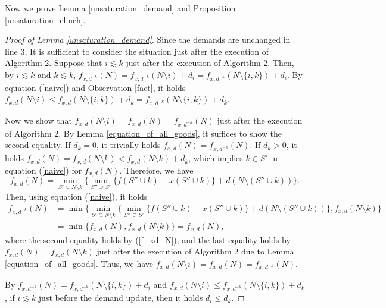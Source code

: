 \documentclass[letterpaper,11pt]{article}
\begin{document}
Now we prove Lemma \ref{unsaturation_demand} and Proposition \ref{unsaturation_clinch}.

\begin{proof}[Proof of Lemma \ref{unsaturation_demand}]
	Since the demands are unchanged in line 3, 
	It is sufficient to consider the situation just after the execution of Algorithm 2. 
	Suppose that $i\lesssim k$ just after the execution of Algorithm 2. 
	Then, by $i\lesssim k$ and $k\lesssim k$, 
	$f_{x,d^{-k}}(N)=f_{x,d^{-k}}(N\setminus i)+d_i=f_{x,d^{-k}}(N\setminus \{i,k\})+d_i$.
	By equation (\ref{naive}) and Observation \ref{fact}, it holds 
	$f_{x,d}(N\setminus i)\leq f_{x,d}(N\setminus \{i,k\})+d_k=f_{x,d^{-k}}(N\setminus \{i,k\})+d_k$.
	
	Now we show that $f_{x,d}(N\setminus i)=f_{x,d}(N)=f_{x,d^{-k}}(N)$ 
	just after the execution of Algorithm 2.
	By Lemma \ref{equation_of_all_goods}, it suffices to show the second equality.
	If $d_k=0$, it trivially holds $f_{x,d}(N)=f_{x,d^{-k}}(N)$.
	If $d_k>0$, it holds $f_{x,d}(N)=f_{x,d}(N\setminus k)<f_{x,d}(N\setminus k)+d_k$, 
	which implies $k\in S'$ in equation (\ref{naive}) for $f_{x,d}(N)$. Therefore, we have
	\begin{equation}
	\label{f_xd_N}
	f_{x,d}(N)=\min_{S'\subseteq N\setminus k }\{\min_{S''\supseteq S'}\{f(S''\cup k)-x(S''\cup k)\}+d(N\setminus (S''\cup k))\}.
	\end{equation}
	Then, using equation (\ref{naive}), it holds 
	\begin{align*}
	\displaystyle f_{x,d^{-k}}(N)&=\min\{ \min_{S'\subseteq N\setminus k }\{\min_{S''\supseteq S'}\{f(S''\cup k)-x(S''\cup k)\}+d(N\setminus (S''\cup k))\}, f_{x,d}(N\setminus k)\}\\
	&=\min\{f_{x,d}(N),f_{x,d}(N\setminus k)\}=f_{x,d}(N),
	\end{align*}
	where the second equality holds by (\ref{f_xd_N}), and the last equality holds by 
	$f_{x,d}(N)=f_{x,d}(N\setminus k)$ just after the execution of Algorithm 2 
	due to Lemma \ref{equation_of_all_goods}.
	Thus, we have $f_{x,d}(N\setminus i)=f_{x,d}(N)=f_{x,d^{-k}}(N)$.
	
	By $f_{x,d^{-k}}(N)=f_{x,d^{-k}}(N\setminus \{i,k\})+d_i$ and 
	$f_{x,d}(N\setminus i)\leq f_{x,d^{-k}}(N\setminus \{i,k\})+d_k$, 
	if $i\lesssim k$ just before the demand update, then it holds $d_i\leq d_k$.
\end{proof}	
\end{document}
